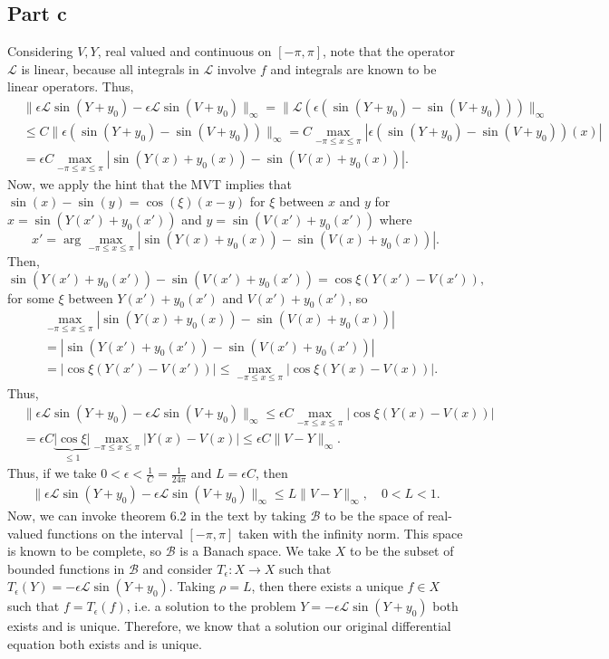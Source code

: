 \documentclass{article}
\begin{document}
\subsection{Part c}
Considering $V,Y$, real valued and continuous on $[-\pi,\pi]$, note that the operator $\mathcal{L}$ is linear, because all integrals in $\mathcal{L}$ involve $f$ and integrals are known to be linear operators. Thus,
\begin{align*}
&\|\epsilon \mathcal L \sin(Y + y_0) - \epsilon \mathcal L \sin(V + y_0)\|_\infty=\| \mathcal L (\epsilon(\sin(Y + y_0) - \sin(V + y_0)))\|_\infty\\&\leq
C\|  \epsilon(\sin(Y + y_0) - \sin(V + y_0))\|_\infty= C\max_{-\pi \leq x \leq \pi}\left|\epsilon(  \sin(Y + y_0) - \sin(V + y_0))(x)\right|\\&=
\epsilon C\max_{-\pi \leq x \leq \pi}\left|  \sin(Y(x) + y_0(x)) - \sin(V(x) + y_0(x))\right|.
\end{align*}
Now, we apply the hint that the MVT implies that $\sin(x) - \sin(y) = \cos(\xi)(x-y)$ for $\xi$ between $x$ and $y$ for $x=\sin(Y(x') + y_0(x'))$ and $y=\sin(V(x') + y_0(x'))$ where
\[
x'=\arg\max_{-\pi \leq x \leq \pi}\left|\sin(Y(x) + y_0(x)) - \sin(V(x) + y_0(x))\right|.
\]
Then, 
\[
\sin(Y(x') + y_0(x')) - \sin(V(x') + y_0(x'))=\cos\xi (Y(x')-V(x')),
\]
for some $\xi$ between $Y(x') + y_0(x')$ and $V(x') + y_0(x')$, so
\begin{align*}
&\max_{-\pi \leq x \leq \pi}\left|  \sin(Y(x) + y_0(x)) - \sin(V(x) + y_0(x))\right|\\&=|\sin(Y(x') + y_0(x')) - \sin(V(x') + y_0(x'))|\\&=
|\cos\xi (Y(x')-V(x'))|\leq\max_{-\pi \leq x \leq \pi}|\cos\xi (Y(x)-V(x))|.
\end{align*}
Thus,
\begin{align*}
&\|\epsilon \mathcal L \sin(Y + y_0) - \epsilon \mathcal L \sin(V + y_0)\|_\infty\leq\epsilon C\max_{-\pi \leq x \leq \pi}\left| \cos\xi (Y(x)-V(x))\right|\\&=
\epsilon C\underbrace{|\cos\xi|}_{\leq1}\max_{-\pi \leq x \leq \pi}\left| Y(x)-V(x)\right|\leq\epsilon C\|V-Y\|_\infty.
\end{align*}
Thus, if we take $0<\epsilon< \frac{1}{C}=\frac{1}{24\pi}$ and $L=\epsilon C$, then 
\begin{align*}
      \|\epsilon \mathcal L \sin(Y + y_0) - \epsilon \mathcal L \sin(V + y_0)\|_\infty \leq L \|V -Y\|_\infty, \quad 0 < L < 1.
\end{align*}
Now, we can invoke theorem 6.2 in the text by taking $\mathcal{B}$ to be the space of real-valued functions on the interval $[-\pi,\pi]$ taken with the infinity norm. This space is known to be complete, so $\mathcal{B}$ is a Banach space. We take $X$ to be the subset of bounded functions in $\mathcal{B}$ and consider $T_\epsilon:X\to X$ such that $T_\epsilon(Y)=-\epsilon \mathcal L \sin(Y + y_0)$. Taking $\rho=L$, then there exists a unique $f\in X$ such that $f=T_\epsilon(f)$, i.e. a solution to the problem $Y = -\epsilon \mathcal L \sin(Y + y_0)$ both exists and is unique. Therefore, we know that a solution our original differential equation both exists and is unique. 
\end{document}
